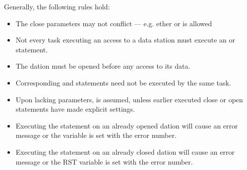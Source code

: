Generally, the following rules hold:
\begin{itemize}
\item The close parameters may not conflict --- e.g. ether  or  is allowed
\item Not every task executing an access to a data station must execute
an  or  statement.
\item The dation must be opened before any access to its data.

\item Corresponding  and  statements need not be executed by
the same task.
\item Upon lacking parameters,  is assumed, unless earlier
executed close or open statements have made explicit settings.

\item
Executing the  statement on an already opened dation
will cause an error message or the  variable is set with the error
number.
\item
Executing the  statement on an already closed dation
will cause an error message or the RST variable is set with the error
number.
\end{itemize}


